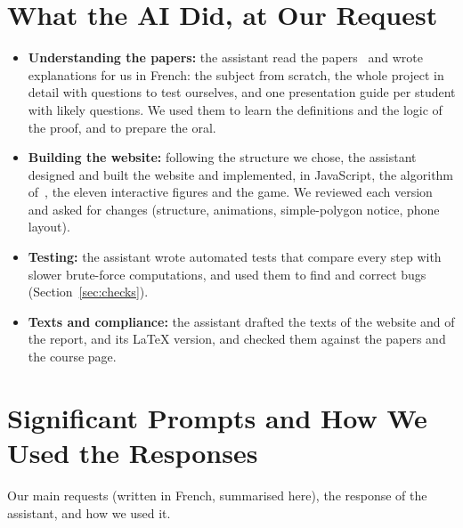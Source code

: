 \documentclass[11pt,a4paper]{article}
\begin{document}
\section{What the AI Did, at Our Request}

\begin{itemize}[leftmargin=*]
\item \textbf{Understanding the papers:} the assistant read the papers~\cite{Biniaz2025,Merrild2024,Biniaz2024,Robson2024,deBerg2025,deBerg2026} and wrote
explanations for us in French: the subject from scratch, the whole project in detail with questions to test ourselves, and one presentation guide per
student with likely questions. We used them to learn the definitions and the logic of the proof, and to prepare the oral.
\item \textbf{Building the website:} following the structure we chose, the assistant designed and built the website and implemented, in JavaScript, the
algorithm of~\cite{deBerg2025}, the eleven interactive figures and the game. We reviewed each version and asked for changes (structure, animations,
simple-polygon notice, phone layout).
\item \textbf{Testing:} the assistant wrote automated tests that compare every step with slower brute-force computations, and used them to find and correct
bugs (Section~\ref{sec:checks}).
\item \textbf{Texts and compliance:} the assistant drafted the texts of the website and of the report, and its LaTeX version, and checked them against the
papers and the course page.
\end{itemize}

\section{Significant Prompts and How We Used the Responses}
\label{sec:prompts}

Our main requests (written in French, summarised here), the response of the assistant, and how we used it.
\end{document}
